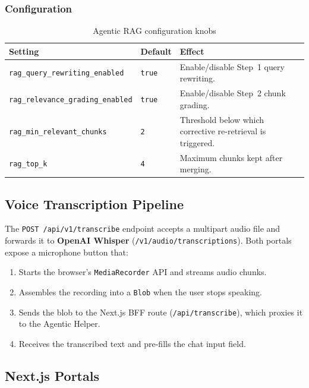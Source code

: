\subsubsection{Configuration}

\begin{table}[H]
\centering
\caption{Agentic RAG configuration knobs}
\label{tab:agentic_rag_config}
\begin{tabularx}{\textwidth}{llX}
\toprule
\textbf{Setting} & \textbf{Default} & \textbf{Effect} \\
\midrule
\texttt{rag\_query\_rewriting\_enabled}  & \texttt{true}  & Enable/disable Step~1 query rewriting. \\
\texttt{rag\_relevance\_grading\_enabled}& \texttt{true}  & Enable/disable Step~2 chunk grading. \\
\texttt{rag\_min\_relevant\_chunks}      & \texttt{2}     & Threshold below which corrective re-retrieval is triggered. \\
\texttt{rag\_top\_k}                     & \texttt{4}     & Maximum chunks kept after merging. \\
\bottomrule
\end{tabularx}
\end{table}

\subsection{Voice Transcription Pipeline}

The \texttt{POST /api/v1/transcribe} endpoint accepts a multipart audio file and forwards it to
\textbf{OpenAI Whisper} (\texttt{/v1/audio/transcriptions}). Both portals expose a microphone
button that:

\begin{enumerate}
  \item Starts the browser's \texttt{MediaRecorder} API and streams audio chunks.
  \item Assembles the recording into a \texttt{Blob} when the user stops speaking.
  \item Sends the blob to the Next.js BFF route (\texttt{/api/transcribe}), which proxies it
    to the Agentic Helper.
  \item Receives the transcribed text and pre-fills the chat input field.
\end{enumerate}

\subsection{Next.js Portals}

